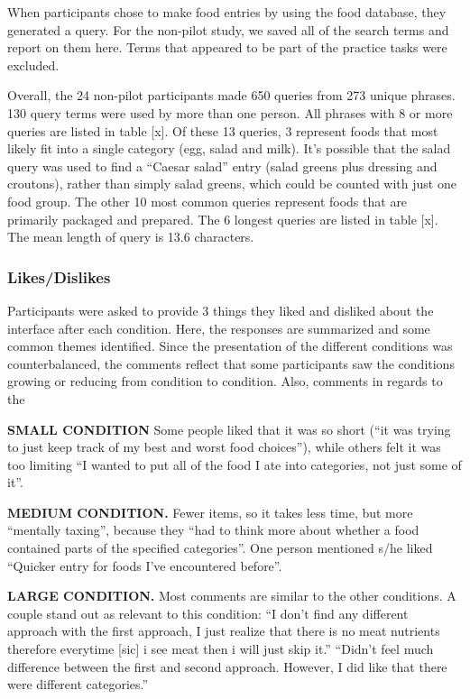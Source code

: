 When participants chose to make food entries by using the food database, they generated a query. For the non-pilot study, we saved all of the search terms and report on them here. Terms that appeared to be part of the practice tasks were excluded. 

Overall, the 24 non-pilot participants made 650 queries from 273 unique phrases. 130 query terms were used by more than one person. All phrases with 8 or more queries are listed in table [x]. Of these 13 queries, 3 represent foods that most likely fit into a single category (egg, salad and milk). It's possible that the salad query was used to find a ``Caesar salad'' entry (salad greens plus dressing and croutons), rather than simply salad greens, which could be counted with just one food group. The other 10 most common queries represent foods that are primarily packaged and prepared. The 6 longest queries are listed in table [x]. The mean length of query is 13.6 characters. 

\subsubsection{Likes/Dislikes}
Participants were asked to provide 3 things they liked and disliked about the interface after each condition. Here, the responses are summarized and some common themes identified. Since the presentation of the different conditions was counterbalanced, the comments reflect that some participants saw the conditions growing or reducing from condition to condition. Also, comments in regards to the 

\textbf{SMALL CONDITION}
Some people liked that it was so short (``it was trying to just keep track of my best and worst food choices''), while others felt it was too limiting ``I wanted to put all of the food I ate into categories, not just some of it''. 

\textbf{MEDIUM CONDITION.}
Fewer items, so it takes less time, but more ``mentally taxing'', because they ``had to think more about whether a food contained parts of the specified categories''. One person mentioned s/he liked ``Quicker entry for foods I've encountered before''. 

\textbf{LARGE CONDITION.}
Most comments are similar to the other conditions. A couple stand out as relevant to this condition: ``I don't find any different approach with the first approach, I just realize that there is no meat nutrients therefore everytime [sic] i see meat then i will just skip it.'' ``Didn't feel much difference between the first and second approach. However, I did like that there were different categories.''

